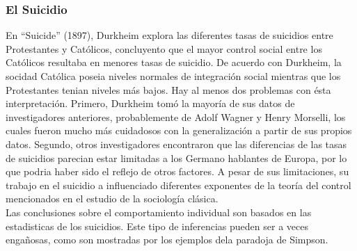 \subsubsection{El Suicidio}
En ``Suicide'' (1897), Durkheim explora las diferentes tasas de suicidios entre Protestantes y Cat\'olicos, concluyento que el mayor control social entre los Cat\'olicos resultaba en menores tasas de suicidio.
De acuerdo con Durkheim, la socidad Cat\'olica poseia niveles normales de integraci\'on social mientras que los Protestantes tenian niveles m\'as bajos.
Hay al menos dos problemas con \'esta interpretaci\'on.
Primero, Durkheim tom\'o la mayor\'ia de sus datos de investigadores anteriores, probablemente de Adolf Wagner y Henry Morselli, los cuales fueron mucho m\'as cuidadosos con la generalizaci\'on a partir de sus propios datos.  
Segundo, otros investigadores encontraron que las diferencias de las tasas de suicidios parecian estar limitadas a los Germano hablantes de Europa, por lo que podria haber sido el reflejo de otros factores.
A pesar de sus limitaciones, su trabajo en el suicidio a influenciado diferentes exponentes de la teor\'ia del control mencionados en el estudio de la sociolog\'ia cl\'asica.\\
Las conclusiones sobre el comportamiento individual son basados en las estadisticas de los suicidios. Este tipo de inferencias pueden ser a veces enga\~nosas, como son mostradas por los ejemplos dela paradoja de Simpson.\\

